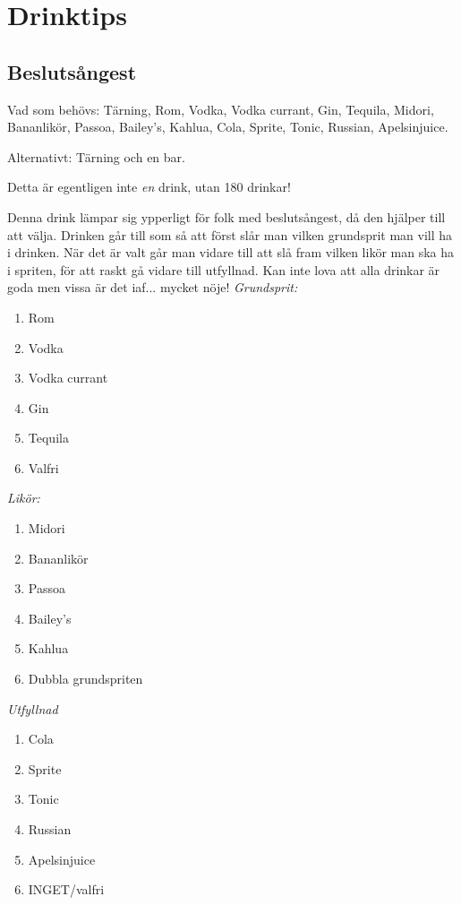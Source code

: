 
\section{Drinktips}

\pagestyle{Drinktips}


\filbreak
\subsection*{\textbf{Beslutsångest}}

Vad som behövs: Tärning, Rom, Vodka, Vodka currant, Gin, Tequila, Midori, Bananlikör, Passoa, Bailey's, Kahlua, Cola, Sprite, Tonic, Russian, Apelsinjuice.

Alternativt: Tärning och en bar.

Detta är egentligen inte \emph{en} drink, utan 180 drinkar!

Denna drink lämpar sig ypperligt för folk med beslutsångest, då den hjälper till att välja. Drinken går till som så att först slår man vilken grundsprit man vill ha i drinken. När det är valt går man vidare till att slå fram vilken likör man ska ha i spriten, för att raskt gå vidare till utfyllnad. Kan inte lova att alla drinkar är goda men vissa är det iaf... mycket nöje!
\filbreak
\emph{Grundsprit:}
\begin{enumerate}
    \item Rom
    \item Vodka
    \item Vodka currant
    \item Gin
    \item Tequila
    \item Valfri
\end{enumerate}
\filbreak
\emph{Likör:}
\begin{enumerate}
    \item Midori
    \item Bananlikör
    \item Passoa
    \item Bailey's
    \item Kahlua
    \item Dubbla grundspriten
\end{enumerate}
\filbreak
\emph{Utfyllnad}
\begin{enumerate}
    \item Cola
    \item Sprite
    \item Tonic
    \item Russian
    \item Apelsinjuice
    \item INGET/valfri
\end{enumerate}
\filbreak
